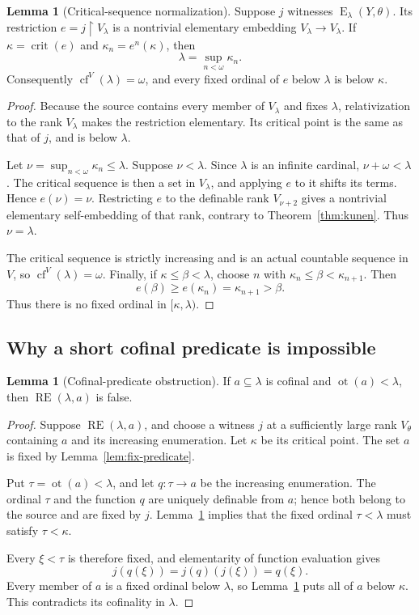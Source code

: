 \documentclass[11pt,letterpaper]{article}
\theoremstyle{definition}
\newtheorem{lemma}[definition]{Lemma}
\newcommand{\crit}{\operatorname{crit}}
\newcommand{\cf}{\operatorname{cf}}
\newcommand{\ot}{\operatorname{ot}}
\newcommand{\restr}{\mathbin{\upharpoonright}}
\newcommand{\RE}{\operatorname{RE}}
\newcommand{\Erel}{\operatorname{E}}
\begin{document}
\begin{lemma}[Critical-sequence normalization]\label{lem:normalization}
Suppose $j$ witnesses $\Erel_\lambda(Y,\theta)$. Its restriction $e=j\restr V_\lambda$ is a nontrivial elementary embedding $V_\lambda\to V_\lambda$. If $\kappa=\crit(e)$ and $\kappa_n=e^n(\kappa)$, then
\begin{equation}\label{eq:critical-limit}
\lambda=\sup_{n<\omega}\kappa_n.
\end{equation}
Consequently $\cf^V(\lambda)=\omega$, and every fixed ordinal of $e$ below $\lambda$ is below $\kappa$.
\end{lemma}
\begin{proof}
Because the source contains every member of $V_\lambda$ and fixes $\lambda$, relativization to the rank $V_\lambda$ makes the restriction elementary. Its critical point is the same as that of $j$, and is below $\lambda$.

Let $\nu=\sup_{n<\omega}\kappa_n\le\lambda$. Suppose $\nu<\lambda$. Since $\lambda$ is an infinite cardinal, $\nu+\omega<\lambda$. The critical sequence is then a set in $V_\lambda$, and applying $e$ to it shifts its terms. Hence $e(\nu)=\nu$. Restricting $e$ to the definable rank $V_{\nu+2}$ gives a nontrivial elementary self-embedding of that rank, contrary to Theorem~\ref{thm:kunen}. Thus $\nu=\lambda$.

The critical sequence is strictly increasing and is an actual countable sequence in $V$, so $\cf^V(\lambda)=\omega$. Finally, if $\kappa\le\beta<\lambda$, choose $n$ with $\kappa_n\le\beta<\kappa_{n+1}$. Then
\[
e(\beta)\ge e(\kappa_n)=\kappa_{n+1}>\beta.
\]
Thus there is no fixed ordinal in $[\kappa,\lambda)$.
\end{proof}

\subsection{Why a short cofinal predicate is impossible}

\begin{lemma}[Cofinal-predicate obstruction]\label{lem:cofinal}
If $a\subseteq\lambda$ is cofinal and $\ot(a)<\lambda$, then $\RE(\lambda,a)$ is false.
\end{lemma}
\begin{proof}
Suppose $\RE(\lambda,a)$, and choose a witness $j$ at a sufficiently large rank $V_\theta$ containing $a$ and its increasing enumeration. Let $\kappa$ be its critical point. The set $a$ is fixed by Lemma~\ref{lem:fix-predicate}.

Put $\tau=\ot(a)<\lambda$, and let $q:\tau\to a$ be the increasing enumeration. The ordinal $\tau$ and the function $q$ are uniquely definable from $a$; hence both belong to the source and are fixed by $j$. Lemma~\ref{lem:normalization} implies that the fixed ordinal $\tau<\lambda$ must satisfy $\tau<\kappa$.

Every $\xi<\tau$ is therefore fixed, and elementarity of function evaluation gives
\[
j(q(\xi))=j(q)(j(\xi))=q(\xi).
\]
Every member of $a$ is a fixed ordinal below $\lambda$, so Lemma~\ref{lem:normalization} puts all of $a$ below $\kappa$. This contradicts its cofinality in $\lambda$.
\end{proof}
\end{document}
